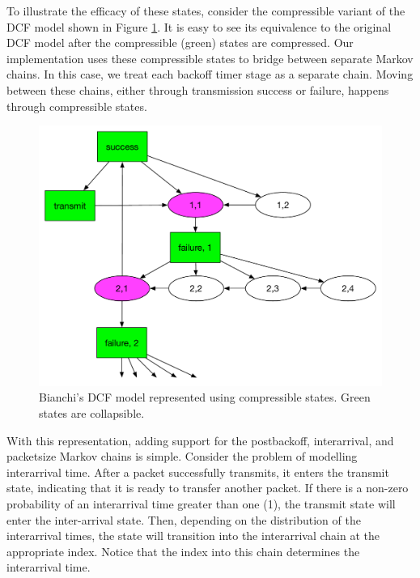 \documentclass[conference]{IEEEtran}
\begin{document}
To illustrate the efficacy of these states, consider the compressible variant of the DCF model shown in Figure \ref{fig:compressible_dcf}. It is easy to see its equivalence to the original DCF model after the compressible (green) states are compressed. Our implementation uses these compressible states to bridge between separate Markov chains. In this case, we treat each backoff timer stage as a separate chain. Moving between these chains, either through transmission success or failure, happens through compressible states.

\begin{figure}
\begin{center}
\includegraphics[scale=0.35]{../../sketches/compressible_dcf.pdf}
\caption{Bianchi's DCF model represented using compressible states. Green states are collapsible.}
\label{fig:compressible_dcf}
\end{center}
\end{figure}

With this representation, adding support for the postbackoff, interarrival, and packetsize Markov chains is simple. Consider the problem of modelling interarrival time. After a packet successfully transmits, it enters the {\sf transmit} state, indicating that it is ready to transfer another packet. If there is a non-zero probability of an interarrival time greater than one (1), the transmit state will enter the {\sf inter-arrival} state. Then, depending on the distribution of the interarrival times, the state will transition into the interarrival chain at the appropriate index. Notice that the index into this chain determines the interarrival time. 
\end{document}

